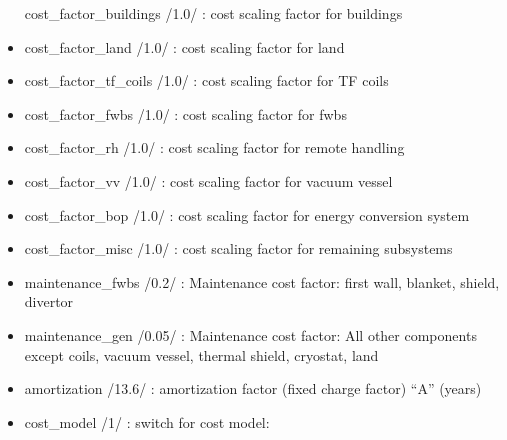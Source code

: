 \documentclass[]{article}
\begin{document}
\begin{itemize}
  cost\_factor\_buildings /1.0/ : cost scaling factor for buildings
\item
  cost\_factor\_land /1.0/ : cost scaling factor for land
\item
  cost\_factor\_tf\_coils /1.0/ : cost scaling factor for TF coils
\item
  cost\_factor\_fwbs /1.0/ : cost scaling factor for fwbs
\item
  cost\_factor\_rh /1.0/ : cost scaling factor for remote handling
\item
  cost\_factor\_vv /1.0/ : cost scaling factor for vacuum vessel
\item
  cost\_factor\_bop /1.0/ : cost scaling factor for energy conversion
  system
\item
  cost\_factor\_misc /1.0/ : cost scaling factor for remaining
  subsystems
\item
  maintenance\_fwbs /0.2/ : Maintenance cost factor: first wall,
  blanket, shield, divertor
\item
  maintenance\_gen /0.05/ : Maintenance cost factor: All other
  components except coils, vacuum vessel, thermal shield, cryostat, land
\item
  amortization /13.6/ : amortization factor (fixed charge factor) ``A''
  (years)
\item
  cost\_model /1/ : switch for cost model:


\end{itemize}
\end{document}
